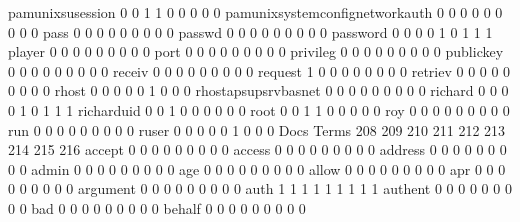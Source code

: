 \documentclass[compress,8pt]{beamer}
\begin{document}
\begin{frame}
\begin{Schunk}
  pamunixsusession                           0   0   1   1   0   0   0   0   0
  pamunixsystemconfignetworkauth             0   0   0   0   0   0   0   0   0
  pass                                       0   0   0   0   0   0   0   0   0
  passwd                                     0   0   0   0   0   0   0   0   0
  password                                   0   0   0   0   1   0   1   1   1
  player                                     0   0   0   0   0   0   0   0   0
  port                                       0   0   0   0   0   0   0   0   0
  privileg                                   0   0   0   0   0   0   0   0   0
  publickey                                  0   0   0   0   0   0   0   0   0
  receiv                                     0   0   0   0   0   0   0   0   0
  request                                    1   0   0   0   0   0   0   0   0
  retriev                                    0   0   0   0   0   0   0   0   0
  rhost                                      0   0   0   0   0   1   0   0   0
  rhostapsupsrvbasnet                        0   0   0   0   0   0   0   0   0
  richard                                    0   0   0   0   1   0   1   1   1
  richarduid                                 0   0   1   0   0   0   0   0   0
  root                                       0   0   1   1   0   0   0   0   0
  roy                                        0   0   0   0   0   0   0   0   0
  run                                        0   0   0   0   0   0   0   0   0
  ruser                                      0   0   0   0   0   1   0   0   0
                                          Docs
Terms                                      208 209 210 211 212 213 214 215 216
  accept                                     0   0   0   0   0   0   0   0   0
  access                                     0   0   0   0   0   0   0   0   0
  address                                    0   0   0   0   0   0   0   0   0
  admin                                      0   0   0   0   0   0   0   0   0
  age                                        0   0   0   0   0   0   0   0   0
  allow                                      0   0   0   0   0   0   0   0   0
  apr                                        0   0   0   0   0   0   0   0   0
  argument                                   0   0   0   0   0   0   0   0   0
  auth                                       1   1   1   1   1   1   1   1   1
  authent                                    0   0   0   0   0   0   0   0   0
  bad                                        0   0   0   0   0   0   0   0   0
  behalf                                     0   0   0   0   0   0   0   0   0

\end{Schunk}
\end{frame}
\end{document}
